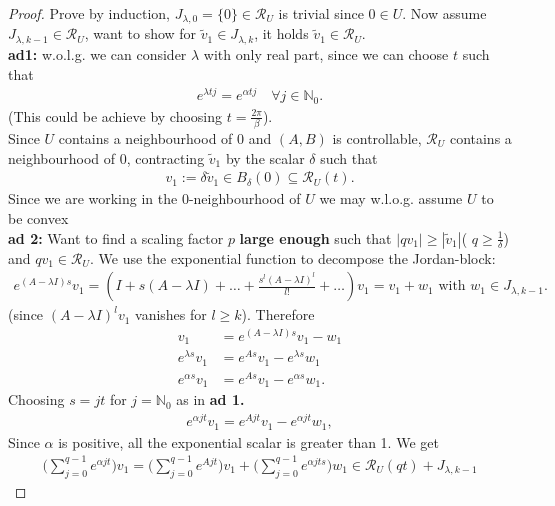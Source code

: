 \documentclass[a4paper,11pt,fleqn]{book}
\theoremstyle{definition}
\theoremstyle{remark}
\begin{document}
\begin{proof}
	Prove by induction, $J_{\lambda, 0} = \{0\} \in \mathcal{R}_U$ is trivial since $0 \in U$. Now assume $J_{\lambda, k - 1} \in \mathcal{R}_U$, want to show for $\tilde{v}_1 \in J_{\lambda, k}$, it holds $\tilde{v}_1 \in \mathcal{R}_U$. \\
	\textbf{ad1:}  w.o.l.g. we can consider $\lambda$ with only real part, since we can choose $t$ such that 
	\begin{align*}
		e^{\lambda tj} = e^{\alpha tj } \quad \forall j \in \mathbb{N}_0.  
	\end{align*}
	(This could be achieve by choosing $t = \frac{2\pi}{\beta}$). \\
	Since $U$ contains a neighbourhood of $0$ and $(A, B)$ is controllable, $\mathcal{R}_U$ contains a neighbourhood of $0$,  contracting $\tilde{v}_1$ by the scalar $\delta$ such that
	\begin{align*}
		v_1 := \delta \tilde{v}_1 \in B_\delta (0) \subseteq \mathcal{R}_U(t).  
	\end{align*}
	Since we are working in the 0-neighbourhood of $U$ we may w.l.o.g. assume $U$ to be convex  \\
	\textbf{ad 2:}
	Want to find a scaling factor $p$ \textbf{large enough} such that $|q v_1| \ge |\tilde{v}_1|$( $q \ge \frac{1}{\delta}$)  and $q v_1 \in \mathcal{R}_U$. We use the exponential function to decompose the Jordan-block:
	\begin{align*}
		e^{(A - \lambda I)s} v_1 = (I + s (A - \lambda I) +  \dots +  \frac{ s^l (A - \lambda I)^l}{l!} +  \dots ) v_1 = v_1 +  w_1 \text{ with } w_1 \in J_{\lambda, k -1}. 
	\end{align*}
	(since $(A - \lambda I)^l v_1$ vanishes for $l \ge k$). Therefore
	\begin{align*}
		v_1 &= e^{(A - \lambda I)s} v_1 - w_1\\
		e^{\lambda s}v_1 &= e^{A s}v_1 - e^{\lambda s }w_1\\
		e^{\alpha s }v_1 &= e^{A s}v_1 - e^{\alpha s }w_1. 
	\end{align*}
	 Choosing $s = jt$ for $j = \mathbb{N}_0$ as in  \textbf{ad 1.}
	\begin{align*}
		e^{\alpha jt } v_1 = e^{Ajt}v_1 - e^{\alpha jt}w_1,
	\end{align*}
	Since $\alpha$ is positive, all the exponential scalar is greater than 1. We get
	\begin{align*}
		\bigg(\sum_{j = 0}^{q - 1} e^{\alpha jt}\bigg) v_1 = \bigg( \sum_{j = 0}^{ q- 1} e^{A j t}\bigg) v_1 + \bigg(\sum_{j = 0}^{q - 1} e^{\alpha jts}\bigg) w_1 \in \mathcal{R}_U(qt) + J_{\lambda, k -1}

\end{align*}
\end{proof}
\end{document}
